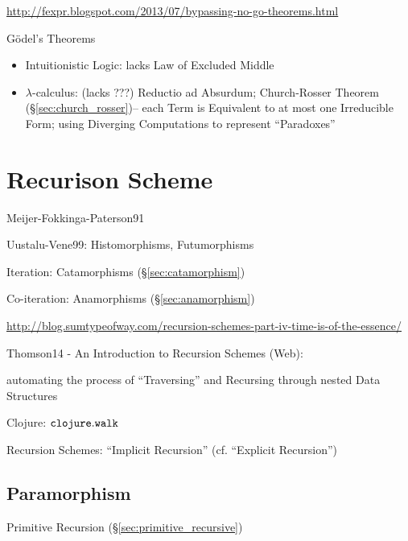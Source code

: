 \url{http://fexpr.blogspot.com/2013/07/bypassing-no-go-theorems.html}

G\"odel's Theorems

\begin{itemize}
\item Intuitionistic Logic: lacks Law of Excluded Middle
\item $\lambda$-calculus: (lacks ???) Reductio ad Absurdum;
  Church-Rosser Theorem (\S\ref{sec:church_rosser})-- each Term is
  Equivalent to at most one Irreducible Form; using
  Diverging Computations to represent ``Paradoxes''
\end{itemize}



\section{Recurison Scheme}\label{sec:recursion_scheme}

Meijer-Fokkinga-Paterson91 %

Uustalu-Vene99: Histomorphisms, Futumorphisms

Iteration: Catamorphisms (\S\ref{sec:catamorphism})

Co-iteration: Anamorphisms (\S\ref{sec:anamorphism})

\url{http://blog.sumtypeofway.com/recursion-schemes-part-iv-time-is-of-the-essence/}

Thomson14 - An Introduction to Recursion Schemes (Web): %

automating the process of ``Traversing'' and Recursing through nested
Data Structures

Clojure: $\mathtt{clojure.walk}$

Recursion Schemes: ``Implicit Recursion'' (cf. ``Explicit Recursion'')



\subsection{Paramorphism}\label{sec:paramorphism}

Primitive Recursion (\S\ref{sec:primitive_recursive})




